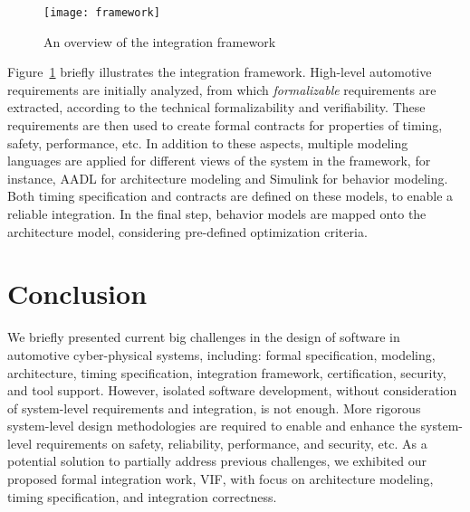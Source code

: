 \begin{figure}[htbp]
	\centering
		\texttt{[image: framework]}
	\caption{An overview of the integration framework}
	\label{fig:framework}
\end{figure}

Figure~\ref{fig:framework} briefly illustrates the integration framework. High-level automotive requirements are initially analyzed, from which \textit{formalizable} requirements are extracted, according to the technical formalizability and verifiability. 
These requirements are then used to create formal contracts for properties of timing, safety, performance, etc. In addition to these aspects, multiple modeling languages are applied for different views of the system in the framework, for instance, AADL for architecture modeling and Simulink for behavior modeling. 
Both timing specification and contracts are defined on these models, to enable a reliable integration. 
In the final step, behavior models are mapped onto the architecture model, considering pre-defined optimization criteria.

\section{Conclusion}
We briefly presented current big challenges in the design of software in automotive cyber-physical systems, including: formal specification, modeling, architecture, timing specification, integration framework, certification, security, and tool support. However, isolated software development, without consideration of system-level requirements and integration, is not enough. More rigorous system-level design methodologies are required to enable and enhance the system-level requirements on safety, reliability, performance, and security, etc. As a potential solution to partially address previous challenges, we  exhibited our proposed formal integration work, VIF, with focus on architecture modeling, timing specification, and integration correctness.

